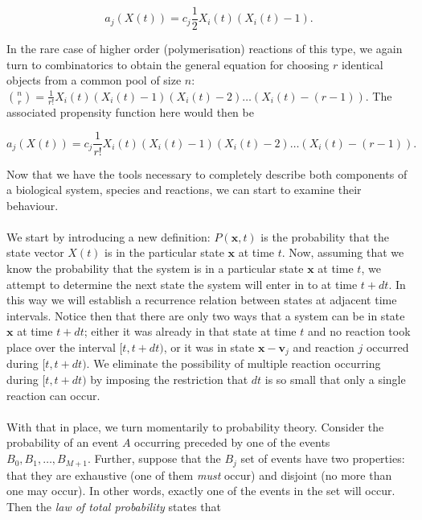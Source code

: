 \documentclass[ugrad,lot,lof,openright,11pt,oneside,onehalfspace]{RUthesis}
\begin{document}
				\begin{equation*}
				a_j(X(t)) = c_j\frac{1}{2}X_i(t)(X_i(t)-1).
				\end{equation*}

				\noindent
				In the rare case of higher order (polymerisation) reactions of this type, we again turn to combinatorics to obtain the general equation for choosing $r$ identical objects from a common pool of size $n$: $\binom{n}{r} = \frac{1}{r!}X_i(t)(X_i(t)-1)(X_i(t)-2)\ldots(X_i(t)-(r-1))$. The associated propensity function here would then be

				\begin{equation*}
				a_j(X(t)) = c_j\frac{1}{r!}X_i(t)(X_i(t)-1)(X_i(t)-2)\ldots(X_i(t)-(r-1)).
				\end{equation*}

				\noindent
				Now that we have the tools necessary to completely describe both components of a biological system, species and reactions, we can start to examine their behaviour.\\
				\\
				We start by introducing a new definition: $P(\mathbf{x},t)$ is the probability that the state vector $X(t)$ is in the particular state $\mathbf{x}$ at time $t$. Now, assuming that we know the probability that the system is in a particular state $\mathbf{x}$ at time $t$, we attempt to determine the next state the system will enter in to at time $t+dt$. In this way we will establish a recurrence relation between states at adjacent time intervals. Notice then that there are only two ways that a system can be in state $\mathbf{x}$ at time $t+dt$; either it was already in that state at time $t$ and no reaction took place over the interval $[t,t+dt)$, or it was in state $\mathbf{x}-\mathbf{v}_j$ and reaction $j$ occurred during $[t,t+dt)$. We eliminate the possibility of multiple reaction occurring during $[t,t+dt)$ by imposing the restriction that $dt$ is so small that only a single reaction can occur.\\
				\\
				With that in place, we turn momentarily to probability theory. Consider the probability of an event $A$ occurring preceded by one of the events $B_0, B_1,\ldots,B_{M+1}$. Further, suppose that the $B_j$ set of events have two properties: that they are exhaustive (one of them \textit{must} occur) and disjoint (no more than one may occur). In other words, exactly one of the events in the set will occur. Then the \textit{law of total probability} states that
\end{document}
